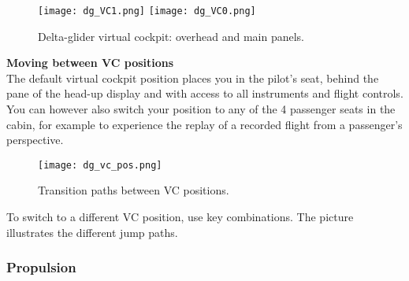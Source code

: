 \documentclass[Orbiter User Manual.tex]{subfiles}
\begin{document}
\begin{figure}[H]
  \centering
  \texttt{[image: dg\_VC1.png]}
  \texttt{[image: dg\_VC0.png]}
  \caption{Delta-glider virtual cockpit: overhead and main panels.}
\end{figure}

\noindent
\textbf{Moving between VC positions}\\
The default virtual cockpit position places you in the pilot's seat, behind the pane of the head-up display and with access to all instruments and flight controls. You can however also switch your position to any of the 4 passenger seats in the cabin, for example to experience the replay of a recorded flight from a passenger's perspective.

\begin{figure}[H]
  \centering
  \texttt{[image: dg\_vc\_pos.png]}
  \caption{Transition paths between VC positions.}
\end{figure}

\noindent
To switch to a different VC position, use \Ctrl\UArrow\DArrow\LArrow\RArrow key combinations. The picture illustrates the different jump paths.


\subsubsection{Propulsion}
\end{document}
